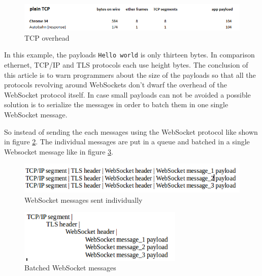 \begin{figure}[H]
\centering
\includegraphics[width=\textwidth]{./Figures/tcp_overhead.png}
\caption[TCP overhead]{TCP overhead \citep{Reference30}}
\label{fig:tcpOverhead}
\end{figure}



In this example, the payloads \texttt{Hello world} is only thirteen bytes. In
comparison ethernet, TCP/IP and TLS protocols each use height bytes. The
conclusion of this article is to warn programmers about the size of the
payloads so that all the protocols revolving around WebSockets don't dwarf the
overhead of the WebSocket protocol itself. In case small payloads can not be
avoided a possible solution is to serialize the messages in order to batch them
in one single WebSocket message.

\newpage

So instead of sending the each messages using the WebSocket protocol like shown
in figure \ref{fig:separateWebsocket}. The individual messages are put in a
queue and batched in a single Websocket message like in figure
\ref{fig:batched_websocket}.


\begin{figure}[H]
\centering
\includegraphics[width=\textwidth]{./Figures/separate_websocket.png}
\caption[Websocket messages sent individually]{WebSocket messages sent individually \citep{Reference30}}
\label{fig:separateWebsocket}
\end{figure}

\vspace{10 mm}

\begin{figure}[H]
\centering
\includegraphics[width=0.7\textwidth]{./Figures/batched_websocket.png}
\caption[Batched WebSocket messages]{Batched WebSocket messages \citep{Reference30}}
\label{fig:batched_websocket}
\end{figure}

